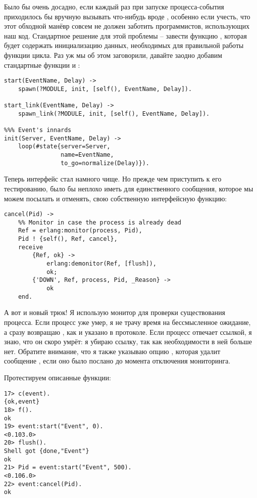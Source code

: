 Было бы очень досадно, если каждый раз при запуске процесса\--события приходилось бы вручную вызывать что\--нибудь вроде , особенно если учесть, что этот  обходной манёвр совсем не должен заботить программистов, использующих наш код.
Стандартное решение для этой проблемы \--- завести функцию , которая будет содержать инициализацию данных, необходимых для правильной работы функции цикла.
Раз уж мы об этом заговорили, давайте заодно добавим стандартные функции  и :
\begin{lstlisting}[style=erlang]
start(EventName, Delay) ->
    spawn(?MODULE, init, [self(), EventName, Delay]).
 
start_link(EventName, Delay) ->
    spawn_link(?MODULE, init, [self(), EventName, Delay]).
 
%%% Event's innards
init(Server, EventName, Delay) ->
    loop(#state{server=Server,
                name=EventName,
                to_go=normalize(Delay)}).
\end{lstlisting}

Теперь интерфейс стал намного чище.
Но прежде чем приступить к его тестированию, было бы неплохо иметь для единственного сообщения, которое мы можем посылать и отменять, свою собственную интерфейсную функцию: 
\begin{lstlisting}[style=erlang]
cancel(Pid) ->
    %% Monitor in case the process is already dead
    Ref = erlang:monitor(process, Pid),
    Pid ! {self(), Ref, cancel},
    receive
        {Ref, ok} ->
            erlang:demonitor(Ref, [flush]),
            ok;
        {'DOWN', Ref, process, Pid, _Reason} ->
            ok
    end.
\end{lstlisting}

А вот и новый трюк!
Я использую монитор для проверки существования процесса.
Если процесс уже умер, я не трачу время на бессмысленное ожидание, а сразу возвращаю , как и указано в протоколе.
Если процесс отвечает ссылкой, я знаю, что он скоро умрёт: я убираю ссылку, так как необходимости в ней больше нет.
Обратите внимание, что я также указываю опцию , которая удалит сообщение , если оно было послано до момента отключения мониторинга.

Протестируем описанные функции:
\begin{lstlisting}[style=erlang]
17> c(event).
{ok,event}
18> f().
ok
19> event:start("Event", 0).
<0.103.0>
20> flush().
Shell got {done,"Event"}
ok
21> Pid = event:start("Event", 500).
<0.106.0>
22> event:cancel(Pid).
ok
\end{lstlisting}

